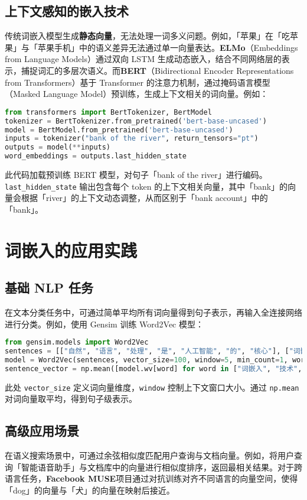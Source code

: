\section{上下文感知的嵌入技术}
传统词嵌入模型生成\textbf{静态向量}，无法处理一词多义问题。例如，「苹果」在「吃苹果」与「苹果手机」中的语义差异无法通过单一向量表达。\textbf{ELMo}（Embeddings from Language Models）通过双向 LSTM 生成动态嵌入，结合不同网络层的表示，捕捉词汇的多层次语义。而\textbf{BERT}（Bidirectional Encoder Representations from Transformers）基于 Transformer 的注意力机制，通过掩码语言模型（Masked Language Model）预训练，生成上下文相关的词向量。例如：\par
\begin{lstlisting}[language=python]
from transformers import BertTokenizer, BertModel
tokenizer = BertTokenizer.from_pretrained('bert-base-uncased')
model = BertModel.from_pretrained('bert-base-uncased')
inputs = tokenizer("bank of the river", return_tensors="pt")
outputs = model(**inputs)
word_embeddings = outputs.last_hidden_state
\end{lstlisting}
此代码加载预训练 BERT 模型，对句子「bank of the river」进行编码。\verb!last_hidden_state! 输出包含每个 token 的上下文相关向量，其中「bank」的向量会根据「river」的上下文动态调整，从而区别于「bank account」中的「bank」。\par
\chapter{词嵌入的应用实践}
\section{基础 NLP 任务}
在文本分类任务中，可通过简单平均所有词向量得到句子表示，再输入全连接网络进行分类。例如，使用 Gensim 训练 Word2Vec 模型：\par
\begin{lstlisting}[language=python]
from gensim.models import Word2Vec
sentences = [["自然", "语言", "处理", "是", "人工智能", "的", "核心"], ["词嵌入", "技术", "推动", "了", "NLP", "发展"]]
model = Word2Vec(sentences, vector_size=100, window=5, min_count=1, workers=4)
sentence_vector = np.mean([model.wv[word] for word in ["词嵌入", "技术", "NLP"]], axis=0)
\end{lstlisting}
此处 \verb!vector_size! 定义词向量维度，\verb!window! 控制上下文窗口大小。通过 \verb!np.mean! 对词向量取平均，得到句子级表示。\par
\section{高级应用场景}
在语义搜索场景中，可通过余弦相似度匹配用户查询与文档向量。例如，将用户查询「智能语音助手」与文档库中的向量进行相似度排序，返回最相关结果。对于跨语言任务，\textbf{Facebook MUSE}项目通过对抗训练对齐不同语言的向量空间，使得「dog」的向量与「犬」的向量在映射后接近。\par
